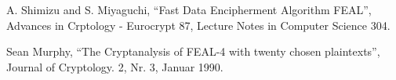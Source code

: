 \begin{thebibliography}{9}

	A. Shimizu and S. Miyaguchi,
	``Fast Data Encipherment Algorithm FEAL'',
	Advances in Crptology - Eurocrypt 87,
	Lecture Notes in Computer Science 304.
	
	Sean Murphy,
	``The Cryptanalysis of FEAL-4 with twenty chosen plaintexts'',
	Journal of Cryptology. 2, Nr. 3, Januar 1990.

\end{thebibliography}